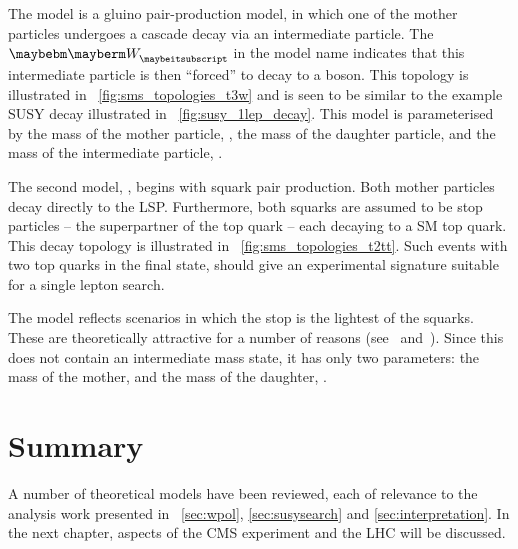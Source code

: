 The \TthreeW model is a gluino pair-production model, in which one of the mother
particles undergoes a cascade decay via an intermediate particle. The $\PW$ in
the model name indicates that this intermediate particle is then ``forced'' to
decay to a \PW boson. This topology is illustrated in
\fig~\ref{fig:sms_topologies_t3w} and is seen to be similar to the example
\ac{SUSY} decay illustrated in \fig~\ref{fig:susy_1lep_decay}. This model is
parameterised by the mass of the mother particle, \Mgluino, the mass of the
daughter particle, \Mlsp and the mass of the intermediate particle, \Mchargino.

The second model, \Ttwott, begins with squark pair production. Both mother
particles decay directly to the \ac{LSP}. Furthermore, both squarks are assumed
to be stop particles -- the superpartner of the top quark -- each decaying to a
\ac{SM} top quark. This decay topology is illustrated in
\fig~\ref{fig:sms_topologies_t2tt}. Such events with two top quarks in the final
state, should give an experimental signature suitable for a single lepton
search.

The \Ttwott model reflects scenarios in which the stop is the lightest of the
squarks. These are theoretically attractive for a number of reasons
(see~\cite[{p.~202}]{sparticles} and~\cite{light_stop}). Since this does not
contain an intermediate mass state, it has only two parameters: the mass of the
mother, \Mstop and the mass of the daughter, \Mlsp.

\section{Summary}
A number of theoretical models have been reviewed, each of relevance to the
analysis work presented in \chaps~\ref{sec:wpol}, \ref{sec:susysearch} and
\ref{sec:interpretation}. In the next chapter, aspects of the \ac{CMS}
experiment and the \ac{LHC} will be discussed.
